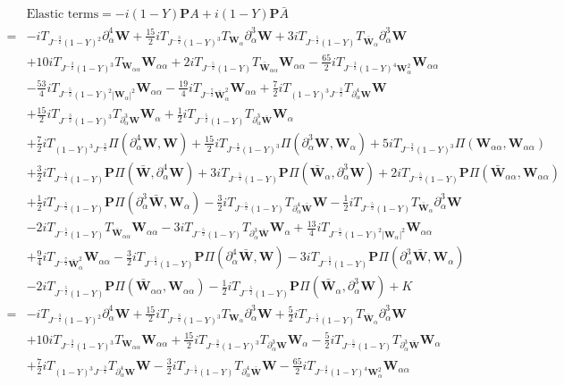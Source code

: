 \documentclass[10pt]{amsart}
\theoremstyle{remark}
\theoremstyle{definition}
\numberwithin{equation}{section}
\newcommand{\p}{\partial}
\newcommand{\al}{\alpha}
\newcommand{\f}{\frac}
\newcommand{\bw}{\mathbf{W}}
\newcommand{\nP}{{\mathbf P}}
\begin{document}
\begin{align*}
    &\text{Elastic terms} =  -i(1-Y)\nP A + i(1-Y)\nP\bar{A}\\
    =&-iT_{J^{-\f32}(1-Y)^2}\p^4_{\al}\bw+\f{15}{2}iT_{J^{-\f32}(1-Y)^3}T_{\bw_{\al}}\p^{3}_{\al}\bw+3 iT_{J^{-\f52}(1-Y)}T_{\bar{\bw}_{\al}}\p^3_{\al}\bw\\
&+10iT_{J^{-\f32}(1-Y)^3}T_{\bw_{\al\al}}\bw_{\al\al}+2i T_{J^{-\f52}(1-Y)}T_{\bar{\bw}_{\al\al}}
\bw_{\al\al}-\f{65}{2}iT_{J^{-\f32}(1-Y)^4\bw_{\al}^2}\bw_{\al\al}\\
&-\f{53}{4}iT_{J^{-\f52}(1-Y)^2|\bw_{\al}|^2}\bw_{\al\al}-\f{19}{4}iT_{J^{-\f72}\bar{\bw}_{\al}^2}\bw_{\al\al}+\f72iT_{(1-Y)^3J^{-\f32}}T_{\p^4_{\al}\bw}\bw\\
&+\f{15}{2}iT_{J^{-\f32}(1-Y)^3}T_{\p^3_{\al}\bw}\bw_{\al}+\f12 iT_{J^{-\f52}(1-Y)}T_{\p^3_{\al}\bar{\bw}}
\bw_{\al}\\
&+\f72i T_{(1-Y)^3J^{-\f32}}\Pi(\p^4_{\al}\bw,\bw) +\f{15}{2}iT_{J^{-\f32}(1-Y)^3}\Pi(\p^3_{\al}\bw,\bw_{\al}) +5iT_{J^{-\f32}(1-Y)^3}\Pi(\bw_{\al\al},\bw_{\al\al})\\
&+\f32i T_{J^{-\f52}(1-Y)}\nP\Pi(\bar{\bw}, \p^4_{\al}\bw)+3i T_{J^{-\f52}(1-Y)}\nP\Pi(\bar{\bw}_{\al}, \p^3_{\al}\bw)+2i T_{J^{-\f52}(1-Y)}\nP\Pi(\bar{\bw}_{\al\al}, \bw_{\al\al})\\
&+\f12i T_{J^{-\f52}(1-Y)}\nP\Pi(\p^3_{\al}\bar{\bw}, \bw_{\al})  - \f32i T_{J^{-\f52}(1-Y)}T_{\p^4_{\al}\bar{\bw}} \bw 
-\f12i T_{J^{-\f52}(1-Y)}T_{\bar{\bw}_{\al}} \p^3_{\al}\bw 
\\
&-2i T_{J^{-\f52}(1-Y)}T_{\bar{\bw}_{\al \al}}\bw_{\al \al} 
-3i T_{J^{-\f52}(1-Y)}T_{\p^3_{\al}\bar{\bw}}\bw_{\al}+\f{13}{4}iT_{J^{-\f52}(1-Y)^2|\bw_{\al}|^2}\bw_{\al\al}\\
&+\f94i T_{J^{-\f72}\bar{\bw}^2_{\al}}\bw_{\al\al} -\f32i T_{J^{-\f52}(1-Y)}\nP\Pi(\p^4_{\al}\bar{\bw}, \bw)- 3iT_{J^{-\f52}(1-Y)}\nP\Pi(\p^3_{\al}\bar{\bw}, \bw_{\al}) \\
&-2i T_{J^{-\f52}(1-Y)} \nP \Pi(\bar{\bw}_{\al \al}, \bw_{\al \al}) -\f12 iT_{J^{-\f52}(1-Y)}\nP \Pi(\bar{\bw}_{\al},
\p^3_{\al}\bw) +K\\
=&-iT_{J^{-\f32}(1-Y)^2}\p^4_{\al}\bw+\f{15}{2}iT_{J^{-\f32}(1-Y)^3}T_{\bw_{\al}}\p^{3}_{\al}\bw+\f52iT_{J^{-\f52}(1-Y)}T_{\bar{\bw}_{\al}}\p^3_{\al}\bw\\
&+10iT_{J^{-\f32}(1-Y)^3}T_{\bw_{\al\al}}\bw_{\al\al}+\f{15}{2}iT_{J^{-\f32}(1-Y)^3}T_{\p^3_{\al}\bw}\bw_{\al}-\f52 iT_{J^{-\f52}(1-Y)}T_{\p^3_{\al}\bar{\bw}}
\bw_{\al} \\
&+\f72iT_{(1-Y)^3J^{-\f32}}T_{\p^4_{\al}\bw}\bw- \f32i T_{J^{-\f52}(1-Y)}T_{\p^4_{\al}\bar{\bw}} \bw-\f{65}{2}iT_{J^{-\f32}(1-Y)^4\bw_{\al}^2}\bw_{\al\al}\\

\end{align*}
\end{document}
